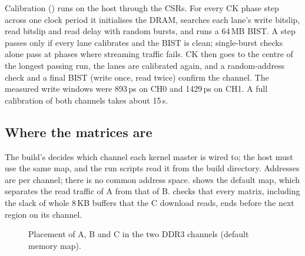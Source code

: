 Calibration () runs on the host through the CSRs. For every CK phase step across one
clock period it initialises the DRAM, searches each lane's write bitslip, read bitslip and read delay with random
bursts, and runs a 64\,MB BIST. A step passes only if every lane calibrates and the BIST is clean; single-burst checks
alone pass at phases where streaming traffic fails. CK then goes to the centre of the longest passing run, the lanes
are calibrated again, and a random-address check and a final BIST (write once, read twice) confirm the channel. The
measured write windows were 893\,ps on CH0 and 1429\,ps on CH1. A full calibration of both channels takes about 15\,s.

\subsection{Where the matrices are}
The build's  decides which channel each kernel master is wired to; the host must use the same map,
and the run scripts read it from the build directory. Addresses are per channel; there is no common address space.
 shows the default map, which separates the read traffic of A from that of B. 
checks that every matrix, including the slack of whole 8\,KB buffers that the C download reads, ends before the next
region on its channel.

\begin{figure}[ht]
  \centering
  \resizebox{0.95\linewidth}{!}{}
  \caption{Placement of A, B and C in the two DDR3 channels (default memory map).}
  \label{fig:memmap}
\end{figure}
